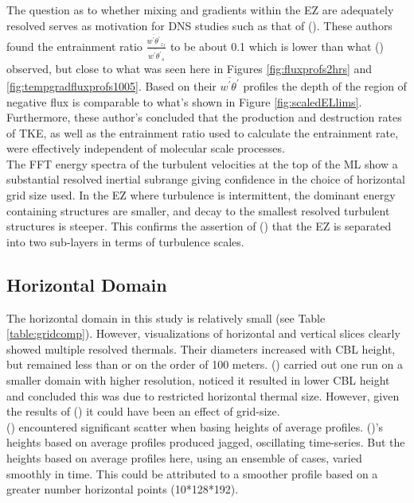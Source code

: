 The question as to whether mixing and gradients within the \acs{EZ} are adequately resolved serves as motivation for \acs{DNS}  studies such as that of \citeauthor{GarciaMellado} (\citeyear{GarciaMellado}). These authors found the entrainment ratio $\frac{\overline{w^{'}\theta^{'}}_{z_{f}}}{\overline{w^{'}\theta^{'}}_{s}}$ to be about 0.1 which is lower than what \citeauthor{FedConzMir04} (\citeyear{FedConzMir04}) observed, but close to what was seen here in Figures \ref{fig:fluxprofs2hrs} and \ref{fig:tempgradfluxprofs1005}.  Based on their $\overline{w^{'}\theta^{'}}$ profiles the depth of the region of negative flux is comparable to what's shown in Figure \ref{fig:scaledELlims}.  Furthermore, these author's concluded that the production and destruction rates of \acs{TKE}, as well as the entrainment ratio used to calculate the entrainment rate, were effectively independent of molecular scale processes.\\  
  
The \acs{FFT} energy spectra of the turbulent velocities at the top of the \acs{ML} show a substantial resolved inertial subrange giving confidence in the choice of horizontal grid size used. In the \acs{EZ} where turbulence is intermittent, the dominant energy containing structures are smaller, and decay to the smallest resolved turbulent structures is steeper. This confirms the assertion of \citeauthor{GarciaMellado} (\citeyear{GarciaMellado}) that the \acs{EZ} is separated into two sub-layers in terms of turbulence scales.\\

\subsection{Horizontal Domain}

The horizontal domain in this study is relatively small (see Table \ref{table:gridcomp}). However, visualizations of horizontal and vertical slices clearly showed multiple resolved thermals.  Their diameters increased with \acs{CBL} height, but remained less than or on the order of 100 meters.  \citeauthor{SullMoengStev} (\citeyear{SullMoengStev}) carried out one run on a smaller domain with higher resolution, noticed it resulted in lower \acs{CBL} height and concluded this was due to restricted horizontal thermal size. However, given the results of \citeauthor{SullPat} (\citeyear{SullPat}) it could have been an effect of grid-size.\\   

\citeauthor{BrooksFowler2} (\citeyear{BrooksFowler2}) encountered significant scatter when basing heights of average profiles.  \citeauthor{SullMoengStev} (\citeyear{SullMoengStev})'s heights based on average profiles produced jagged, oscillating time-series. But the heights based on average profiles here, using an ensemble of cases, varied smoothly in time.  This could be attributed to a smoother profile based on a greater number horizontal points (10*128*192).\\

